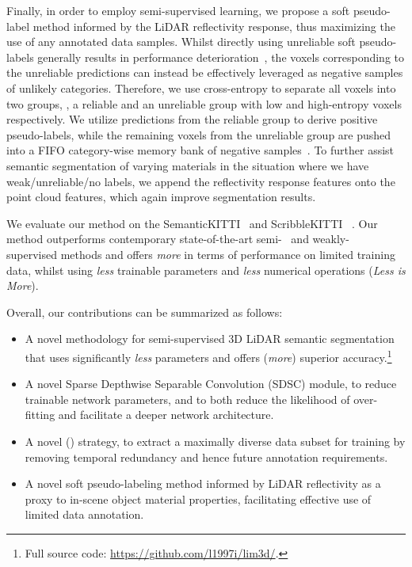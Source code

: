 \documentclass[10pt,twocolumn,letterpaper]{article}
\begin{document}
Finally, in order to employ semi-supervised learning, we propose a soft pseudo-label method informed by the LiDAR reflectivity response, thus maximizing the use of any annotated data samples. Whilst directly using unreliable soft pseudo-labels generally results in performance deterioration~\cite{arazo2020pseudolabeling}, the voxels corresponding to the unreliable predictions can instead be effectively leveraged as negative samples of unlikely categories.  Therefore, we use cross-entropy to separate all voxels into two groups, \ie, a reliable and an unreliable group with low and high-entropy voxels respectively. We utilize predictions from the reliable group to derive positive pseudo-labels, while the remaining voxels from the unreliable group are pushed into a FIFO category-wise memory bank of negative samples~\cite{alonso2021semisuperviseda}. To further assist semantic segmentation of varying materials in the situation where we have weak/unreliable/no labels, we append the reflectivity response features onto the point cloud features, which again improve segmentation results.









We evaluate our method on the SemanticKITTI~\cite{behley2019semantickittia} and ScribbleKITTI~\cite{Unal_2022_CVPR} {\validset}. Our method outperforms contemporary state-of-the-art semi-~\cite{kong2022lasermix,jiang2021guided} and weakly-~\cite{Unal_2022_CVPR} supervised methods and offers \textit{more} in terms of performance on limited training data, whilst using \textit{less} trainable parameters and \textit{less} numerical operations (\textit{Less is More}). 

Overall, our contributions can be summarized as follows:
\begin{itemize}
    \item A novel methodology for semi-supervised 3D LiDAR semantic segmentation that uses significantly \textit{less} parameters and offers (\textit{more}) superior accuracy.\footnote{{Full source code: \url{https://github.com/l1997i/lim3d/}.}}
    
    \item A novel Sparse Depthwise Separable Convolution (SDSC) module, to reduce trainable network parameters, and to both reduce the likelihood of over-fitting and facilitate a deeper network architecture.
    
    \item A novel {\samplfull} ({\samplshort}) strategy, to extract a maximally diverse data subset for training by removing temporal redundancy and hence future annotation requirements.
    
    \item A novel soft pseudo-labeling method informed by LiDAR reflectivity as a proxy to in-scene object material properties,  facilitating effective use of limited data annotation. \end{itemize}
\end{document}
